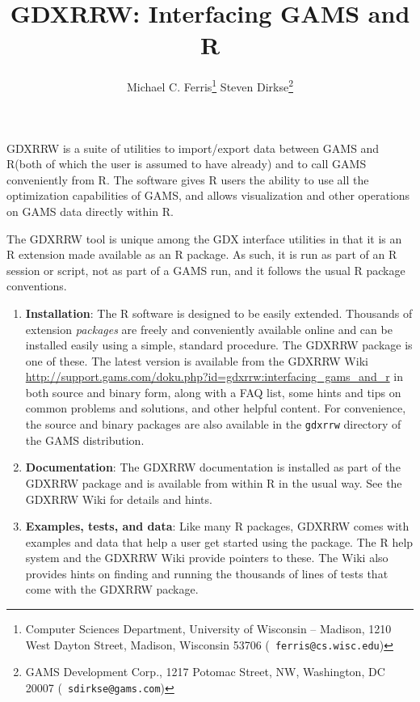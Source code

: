 \documentclass{article}
\newcommand{\gdxrrw}{GDXRRW\xspace}
\newcommand{\R}{R\xspace}
\newcommand{\gams}{GAMS\xspace}
\newcommand{\gdx}{GDX\xspace}
\begin{document}
\title{\gdxrrw: Interfacing \gams and \R}
  \author{Michael C. Ferris\thanks{ Computer
    Sciences Department, University of Wisconsin -- Madison, 1210 West
    Dayton Street, Madison, Wisconsin 53706 ({\tt
    ferris@cs.wisc.edu})}
    \space \space Steven Dirkse\thanks { GAMS Development Corp.,
    1217 Potomac Street, NW,  Washington, DC  20007 ({\tt
    sdirkse@gams.com})}  }
\maketitle

\gdxrrw is a suite of utilities to import/export data between \gams
and \R (both of which the user is assumed to have already) and to
call \gams conveniently from \R.  The software
gives \R users the ability to use all the optimization capabilities of
\gams, and allows visualization and other operations on \gams data
directly within \R.

The \gdxrrw tool is unique among the \gdx interface utilities in that
it is an \R extension made available as an \R package.  As such, it is
run as part of an R session or script, not as part of a GAMS run, and it
follows the usual \R package conventions.
\begin{enumerate}
  \item {\bf Installation}: The \R software is designed to be easily
    extended.  Thousands of extension \emph{packages} are freely and
    conveniently available online and can be installed easily using a simple, standard
    procedure.  The \gdxrrw package is one of these.  The latest
    version is available from the \gdxrrw Wiki
    \url{http://support.gams.com/doku.php?id=gdxrrw:interfacing_gams_and_r} in both source and binary
    form, along with a FAQ list,
    some hints and tips on common problems and solutions, and other
    helpful content.  For convenience, the source and binary packages
    are also available in the {\tt gdxrrw} directory of the GAMS distribution.
  \item {\bf Documentation}: The \gdxrrw documentation is installed as
    part of the \gdxrrw package and is available from within \R in the
    usual way.  See the \gdxrrw Wiki for details and hints.
  \item {\bf Examples, tests, and data}: Like many \R packages,
    \gdxrrw comes with examples and data that help a user get started
    using the package.  The \R help system and the \gdxrrw Wiki
    provide pointers to these.  The Wiki also provides hints on
    finding and running the thousands of lines of tests that come with
    the \gdxrrw package.
\end{enumerate}
\end{document}
